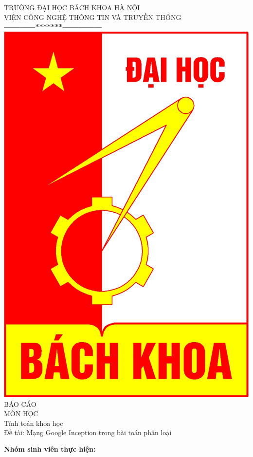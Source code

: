 \documentclass[a4paper,12pt]{report}
\begin{document}
\thispagestyle{empty}
\thisfancypage{
\setlength{\fboxrule}{1pt}
\doublebox}{}
\begin{center}
{\fontsize{16}{19}\selectfont TRƯỜNG ĐẠI HỌC BÁCH KHOA HÀ NỘI\\
VIỆN CÔNG NGHỆ THÔNG TIN VÀ TRUYỀN THÔNG}\\
\textbf{------------*******---------------}\\[1cm]
\includegraphics[scale=0.13]{hust.jpg}\\[1.3cm]

{\fontsize{32}{43}\selectfont BÁO CÁO}\\[0.1cm]
{\fontsize{38}{45}\selectfont MÔN HỌC}\\[0.2cm]
{\fontsize{19}{20}\selectfont Tính toán khoa học }\\[0.2cm]
{\fontsize{13}{20}\selectfont Đề tài: Mạng Google Inception trong bài toán phân loại}\\[2.5cm]
\end{center}
\hspace{1cm}\fontsize{14}{16}\selectfont \textbf{Nhóm sinh viên thực hiện:}
\end{document}
